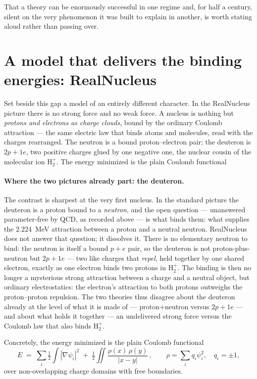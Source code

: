 \documentclass[11pt]{article}
\begin{document}
That a theory can be enormously successful in one regime and, for half a century, silent on the very
phenomenon it was built to explain in another, is worth stating aloud rather than passing over.

\section{A model that delivers the binding energies: RealNucleus}
\label{sec:realnucleus}

Set beside this gap a model of an entirely different character. In the RealNucleus
picture \cite{realnucleus} there is no strong force and no weak force. A nucleus is nothing but
\emph{protons and electrons as charge clouds}, bound by the ordinary Coulomb attraction --- the same
electric law that binds atoms and molecules, read with the charges rearranged. The neutron is a bound
proton--electron pair; the deuteron is $2p+1e$, two positive charges glued by one negative one, the
nuclear cousin of the molecular ion $\mathrm{H}_2^+$. The energy minimized is the plain Coulomb
functional

\paragraph{Where the two pictures already part: the deuteron.} The contrast is sharpest at the very
first nucleus. In the standard picture the deuteron is a proton bound to a \emph{neutron}, and the open
question --- unanswered parameter-free by QCD, as recorded above --- is what binds them: what supplies
the $2.224$~MeV attraction between a proton and a neutral neutron. RealNucleus does not answer that
question; it dissolves it. There is no elementary neutron to bind: the neutron is itself a bound
$p+e$ pair, so the deuteron is not proton-plus-neutron but $2p+1e$ --- two like charges that
\emph{repel}, held together by one shared electron, exactly as one electron binds two protons in
$\mathrm{H}_2^+$. The binding is then no longer a mysterious strong attraction between a charge and a
neutral object, but ordinary electrostatics: the electron's attraction to both protons outweighs the
proton--proton repulsion. The two theories thus disagree about the deuteron already at the level of what
it is made of --- proton$+$neutron versus $2p+1e$ --- and about what holds it together --- an
undelivered strong force versus the Coulomb law that also binds $\mathrm{H}_2^+$.

Concretely, the energy minimized is the plain Coulomb functional
\[
  E \;=\; \sum_i \tfrac12\!\int |\nabla \psi_i|^2
        \;+\; \tfrac12\!\iint \frac{\rho(x)\,\rho(y)}{|x-y|}\,,
  \qquad \rho = \sum_i q_i \psi_i^2,\quad q_i = \pm 1,
\]
over non-overlapping charge domains with free boundaries.
\end{document}
